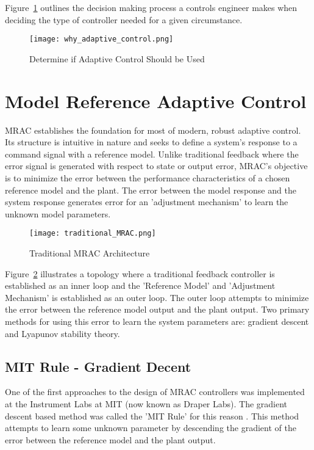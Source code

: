 Figure~\ref{fig:why_adaptive_control} outlines the decision making process a controls engineer makes when deciding the type of controller needed for a given circumstance.

\begin{figure}[h!]
 \centering
  \texttt{[image: why\_adaptive\_control.png]}
  \caption{Determine if Adaptive Control Should be Used}
  \label{fig:why_adaptive_control}
\end{figure}


\section{Model Reference Adaptive Control}
\ac{MRAC} establishes the foundation for most of modern, robust adaptive control.  Its structure is intuitive in nature and seeks to define a system's response to a command signal with a reference model.  Unlike traditional feedback where the error signal is generated with respect to state or output error, \ac{MRAC}'s objective is to minimize the error between the performance characteristics of a chosen reference model and the plant.  The error between the model response and the system response generates error for an 'adjustment mechanism' to learn the unknown model parameters.

\begin{figure}[h!]
 \centering
  \texttt{[image: traditional\_MRAC.png]}
  \caption{Traditional \ac{MRAC} Architecture }
  \label{fig:traditional_mrac}
\end{figure}

Figure~\ref{fig:traditional_mrac} illustrates a topology where a traditional feedback controller is established as an inner loop and the 'Reference Model' and 'Adjustment Mechanism' is established as an outer loop.  The outer loop attempts to minimize the error between the reference model output and the plant output.  Two primary methods for using this error to learn the system parameters are: gradient descent and Lyapunov stability theory.

\subsection{MIT Rule - Gradient Decent}
One of the first approaches to the design of \ac{MRAC} controllers was implemented at the Instrument Labs at MIT (now known as Draper Labs).  The gradient descent based method was called the 'MIT Rule' for this reason \cite{aastrom2013adaptive}.  This method attempts to learn some unknown parameter by descending the gradient of the error between the reference model and the plant output.

